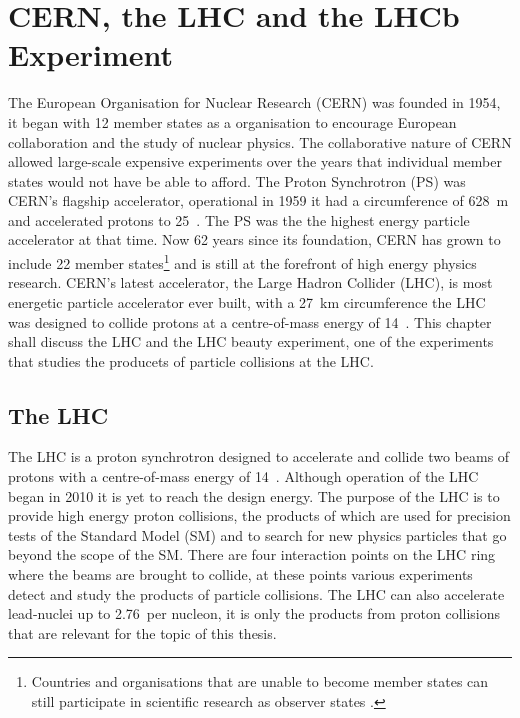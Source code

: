 \chapter{CERN, the LHC and the LHCb Experiment} 
\label{CERN_LHC_LHCb}

The European Organisation for Nuclear Research (CERN) was founded in 1954, it began with 12 member states as a organisation to encourage European collaboration and the study of nuclear physics. The collaborative nature of CERN allowed large-scale expensive experiments over the years that individual member states would not have be able to afford. The Proton Synchrotron (PS) was CERN's flagship accelerator, operational in 1959 it had a circumference of 628~m and accelerated protons to 25~\gev. The PS was the the highest energy particle accelerator at that time. Now 62 years since its foundation, CERN has grown to include 22 member states\footnote{Countries and organisations that are unable to become member states can still participate in scientific research as observer states \cite{Member_States}.} and is still at the forefront of high energy physics research. CERN’s latest accelerator, the Large Hadron Collider (LHC), is most energetic particle accelerator ever built, with a 27~km circumference the LHC was designed to collide protons at a centre-of-mass energy of 14~\tev. This chapter shall discuss the LHC and the LHC beauty experiment, one of the experiments that studies the producets of particle collisions at the LHC.

\section{The LHC}
\label{LHC}


The LHC is a proton synchrotron designed to accelerate and collide two beams of protons with a centre-of-mass energy of 14~\tev. Although operation of the LHC began in 2010 it is yet to reach the design energy. The purpose of the LHC is to provide high energy proton collisions, the products of which are used for precision tests of the Standard Model (SM) and to search for new physics particles that go beyond the scope of the SM. There are four interaction points on the LHC ring where the beams are brought to collide, at these points various experiments detect and study the products of particle collisions. The LHC can also accelerate lead-nuclei up to 2.76~\tev per nucleon, it is only the products from proton collisions that are relevant for the topic of this thesis.

